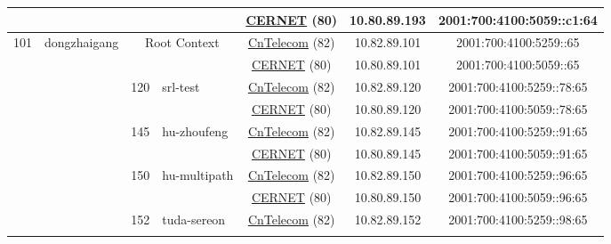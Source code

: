 \begin{small}
\begin{center}
\begin{longtable}{|c|c|c|c|c|c|c|c|}
  &  &  &  & \multicolumn{2}{|c|}{\tiny{\href{http://www.cernet.edu.cn}{CERNET} (80)}} & \tiny{10.80.89.193} & \tiny{2001:700:4100:5059::c1:64} \\ \hline
 \multirow{20}{*}{\tiny{101}} & \multicolumn{1}{|l|}{\multirow{20}{*}{\tiny{dongzhaigang}}} & \multicolumn{2}{|c|}{\multirow{2}{*}{\tiny{Root Context}}} & \multicolumn{2}{|c|}{\tiny{\href{http://www.chinatelecom.com.cn}{CnTelecom} (82)}} & \tiny{10.82.89.101} & \tiny{2001:700:4100:5259::65} \\* \cline{5-5}\cline{6-6}\cline{7-7}\cline{8-8}
  &  & \multicolumn{2}{|c|}{} & \multicolumn{2}{|c|}{\tiny{\href{http://www.cernet.edu.cn}{CERNET} (80)}} & \tiny{10.80.89.101} & \tiny{2001:700:4100:5059::65} \\* \cline{3-3}\cline{4-4}\cline{5-5}\cline{6-6}\cline{7-7}\cline{8-8}
  &  & \multirow{2}{*}{\tiny{120}} & \multicolumn{1}{|l|}{\multirow{2}{*}{\tiny{srl-test}}} & \multicolumn{2}{|c|}{\tiny{\href{http://www.chinatelecom.com.cn}{CnTelecom} (82)}} & \tiny{10.82.89.120} & \tiny{2001:700:4100:5259::78:65} \\* \cline{5-5}\cline{6-6}\cline{7-7}\cline{8-8}
  &  &  &  & \multicolumn{2}{|c|}{\tiny{\href{http://www.cernet.edu.cn}{CERNET} (80)}} & \tiny{10.80.89.120} & \tiny{2001:700:4100:5059::78:65} \\* \cline{3-3}\cline{4-4}\cline{5-5}\cline{6-6}\cline{7-7}\cline{8-8}
  &  & \multirow{2}{*}{\tiny{145}} & \multicolumn{1}{|l|}{\multirow{2}{*}{\tiny{hu-zhoufeng}}} & \multicolumn{2}{|c|}{\tiny{\href{http://www.chinatelecom.com.cn}{CnTelecom} (82)}} & \tiny{10.82.89.145} & \tiny{2001:700:4100:5259::91:65} \\* \cline{5-5}\cline{6-6}\cline{7-7}\cline{8-8}
  &  &  &  & \multicolumn{2}{|c|}{\tiny{\href{http://www.cernet.edu.cn}{CERNET} (80)}} & \tiny{10.80.89.145} & \tiny{2001:700:4100:5059::91:65} \\* \cline{3-3}\cline{4-4}\cline{5-5}\cline{6-6}\cline{7-7}\cline{8-8}
  &  & \multirow{2}{*}{\tiny{150}} & \multicolumn{1}{|l|}{\multirow{2}{*}{\tiny{hu-multipath}}} & \multicolumn{2}{|c|}{\tiny{\href{http://www.chinatelecom.com.cn}{CnTelecom} (82)}} & \tiny{10.82.89.150} & \tiny{2001:700:4100:5259::96:65} \\* \cline{5-5}\cline{6-6}\cline{7-7}\cline{8-8}
  &  &  &  & \multicolumn{2}{|c|}{\tiny{\href{http://www.cernet.edu.cn}{CERNET} (80)}} & \tiny{10.80.89.150} & \tiny{2001:700:4100:5059::96:65} \\* \cline{3-3}\cline{4-4}\cline{5-5}\cline{6-6}\cline{7-7}\cline{8-8}
  &  & \multirow{2}{*}{\tiny{152}} & \multicolumn{1}{|l|}{\multirow{2}{*}{\tiny{tuda-sereon}}} & \multicolumn{2}{|c|}{\tiny{\href{http://www.chinatelecom.com.cn}{CnTelecom} (82)}} & \tiny{10.82.89.152} & \tiny{2001:700:4100:5259::98:65} \\* \cline{5-5}\cline{6-6}\cline{7-7}\cline{8-8}

\end{longtable}
\end{center}
\end{small}
